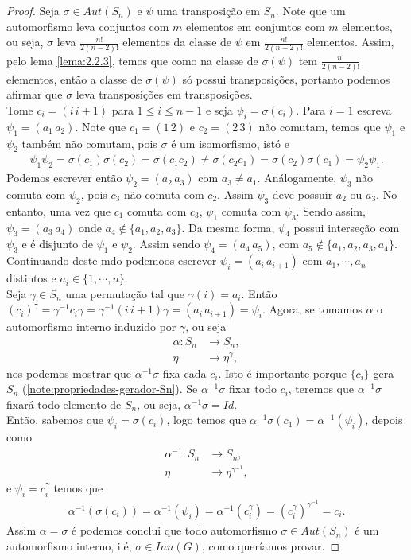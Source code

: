 \begin{proof} 
  Seja $\sigma\in Aut(S_n)$ e $\psi$ uma transposição em $S_n$. Note que um automorfismo leva conjuntos com $m$ elementos em conjuntos com $m$ elementos, ou seja, $\sigma$ leva $\frac{n!}{2(n-2)!}$ elementos da classe de $\psi$ em $\frac{n!}{2(n-2)!}$ elementos. Assim, pelo lema \ref{lema:2.2.3}, temos que como na classe de $\sigma(\psi)$ tem $\frac{n!}{2(n-2)!}$ elementos, então a classe de $\sigma(\psi)$ só possui transposições, portanto podemos afirmar que $\sigma$ leva transposições em transposições.\\
  Tome $c_i=(i\,i+1)$ para $1\leq i\leq n-1$ e seja $\psi_i=\sigma(c_i)$. Para $i=1$ escreva $\psi_1=(a_1\,a_2)$. Note que $c_1=(1\,2)$ e $c_2=(2\,3)$ não comutam, temos que $\psi_1$ e $\psi_2$ também não comutam, pois $\sigma$ é um isomorfismo, istó e
  \begin{align*}
    \psi_1\psi_2=\sigma(c_1)\sigma(c_2)=\sigma(c_1c_2)\neq\sigma(c_2c_1)=\sigma(c_2)\sigma(c_1)=\psi_2\psi_1.
  \end{align*}
  Podemos escrever então $\psi_2=(a_2\,a_3)$ com $a_3\neq a_1$. Análogamente, $\psi_3$ não comuta com $\psi_2$, pois $c_3$ não comuta com $c_2$. Assim $\psi_3$ deve possuir $a_2$ ou $a_3$. No entanto, uma vez que $c_1$ comuta com $c_3$, $\psi_1$ comuta com $\psi_3$. Sendo assim, $\psi_3=(a_3\,a_4)$ onde $a_4\notin\{a_1,a_2,a_3\}$. Da mesma forma, $\psi_4$ possui interseção com $\psi_3$ e é disjunto de $\psi_1$ e $\psi_2$. Assim sendo $\psi_4=(a_4\,a_5)$, com $a_5\notin\{a_1,a_2,a_3,a_4\}$. Continuando deste mdo podemoos escrever $\psi_i=(a_i\,a_{i+1})$ com $a_1,\cdots,a_n$ distintos e $a_i\in\{1,\cdots,n\}$.\\
  Seja $\gamma\in S_n$ uma permutação tal que $\gamma(i)=a_i$. Então $(c_i)^{\gamma}=\gamma^{-1}c_i\gamma=\gamma^{-1}(i\,i+1)\gamma=(a_{i}\,a_{i+1})=\psi_i$. Agora, se tomamos $\alpha$ o automorfismo interno induzido por $\gamma$, ou seja
  \begin{align*}
    \alpha:S_n&\to S_n,\\
            \eta&\to\eta^{\gamma},
  \end{align*}
  nos podemos mostrar que $\alpha^{-1}\sigma$ fixa cada $c_i$. Isto é importante porque $\{c_i\}$ gera $S_n$ (\ref{note:propriedades-gerador-Sn}). Se $\alpha^{-1}\sigma$ fixar todo $c_i$, teremos que $\alpha^{-1}\sigma$ fixará todo elemento de $S_n$, ou seja, $\alpha^{-1}\sigma=Id$.\\
  Então, sabemos que $\psi_i=\sigma(c_i)$, logo temos que $\alpha^{-1}\sigma(c_1)=\alpha^{-1}(\psi_i)$, depois como
  \begin{align*}
    \alpha^{-1}:S_n&\to S_n,\\
               \eta&\to\eta^{\gamma^{-1}},
  \end{align*}
  e $\psi_i=c_i^{\gamma}$ temos que
  \begin{align*}
    \alpha^{-1}(\sigma(c_i))=\alpha^{-1}(\psi_i)=\alpha^{-1}(c_i^{\gamma})=(c_i^{\gamma})^{\gamma^{-1}}=c_i.
  \end{align*}
  Assim $\alpha=\sigma$ é podemos conclui que todo automorfismo $\sigma\in Aut(S_n)$ é um automorfismo interno, i.é, $\sigma\in Inn(G)$, como queríamos provar. 
\end{proof}
